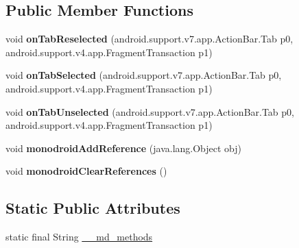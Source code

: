 \subsection*{Public Member Functions}
\begin{DoxyCompactItemize}
\item 
\mbox{\label{classmono_1_1android_1_1support_1_1v7_1_1app_1_1_action_bar___tab_listener_implementor_a6b35cb09703a4c23539a8e4396b9c863}} 
void {\bfseries on\+Tab\+Reselected} (android.\+support.\+v7.\+app.\+Action\+Bar.\+Tab p0, android.\+support.\+v4.\+app.\+Fragment\+Transaction p1)
\item 
\mbox{\label{classmono_1_1android_1_1support_1_1v7_1_1app_1_1_action_bar___tab_listener_implementor_aaff79de08cbe6639362e13d59b7e4e4a}} 
void {\bfseries on\+Tab\+Selected} (android.\+support.\+v7.\+app.\+Action\+Bar.\+Tab p0, android.\+support.\+v4.\+app.\+Fragment\+Transaction p1)
\item 
\mbox{\label{classmono_1_1android_1_1support_1_1v7_1_1app_1_1_action_bar___tab_listener_implementor_af68d830015bf6da6d2dc1ae38e124dd6}} 
void {\bfseries on\+Tab\+Unselected} (android.\+support.\+v7.\+app.\+Action\+Bar.\+Tab p0, android.\+support.\+v4.\+app.\+Fragment\+Transaction p1)
\item 
\mbox{\label{classmono_1_1android_1_1support_1_1v7_1_1app_1_1_action_bar___tab_listener_implementor_af54da88b9fc4e1343976e6e7276ecc49}} 
void {\bfseries monodroid\+Add\+Reference} (java.\+lang.\+Object obj)
\item 
\mbox{\label{classmono_1_1android_1_1support_1_1v7_1_1app_1_1_action_bar___tab_listener_implementor_a04a2ade136155c99483da263552b02a5}} 
void {\bfseries monodroid\+Clear\+References} ()
\end{DoxyCompactItemize}
\subsection*{Static Public Attributes}
\begin{DoxyCompactItemize}
\item 
static final String \hyperlink{classmono_1_1android_1_1support_1_1v7_1_1app_1_1_action_bar___tab_listener_implementor_a627fdd5a34632303bbbcda69734cdae1}{\+\_\+\+\_\+md\+\_\+methods}
\end{DoxyCompactItemize}


